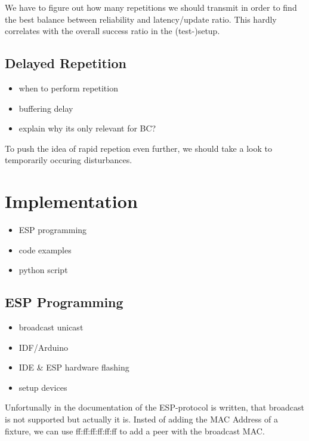 \documentclass[]{ccs-thesis}
\begin{document}
We have to figure out how many repetitions we should transmit in order to find the best balance between reliability and latency/update ratio.
This hardly correlates with the overall success ratio in the (test-)setup. 

\subsection{Delayed Repetition}
\label{sub:DelayedRepetition}
\begin{itemize}
\item when to perform repetition
\item buffering delay
\item explain why its only relevant for BC?
\end{itemize}

To push the idea of rapid repetion even further, we should take a look to temporarily occuring disturbances.

\section{Implementation}
\begin{itemize}
\item ESP programming
\item code examples
\item python script
\end{itemize}


\subsection{ESP Programming}
\begin{itemize}
\item broadcast unicast
\item IDF/Arduino
\item IDE \& ESP hardware flashing
\item setup devices
\end{itemize}
Unfortunally in the documentation of the ESP-protocol is written, that broadcast is not supported 
but actually it is. Insted of adding the \ac{MAC} Address of a fixture, we can use 
 ff:ff:ff:ff:ff:ff 
to add a peer with the broadcast \ac{MAC}.
\end{document}
